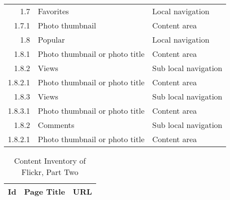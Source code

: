 \documentclass[12pt,a4paper]{article}
\begin{document}
\begin{table}[h!b!p!]
\begin{center}
\begin{small}
\begin{tabular}{|r|l|l|}
              1.7 &
              Favorites &
              Local navigation \\

                1.7.1 &
                Photo thumbnail &
                Content area \\

              1.8 &
              Popular &
              Local navigation \\

                1.8.1 &
                Photo thumbnail or photo title &
                Content area \\

                1.8.2 &
                Views &
                Sub local navigation \\

                  1.8.2.1 &
                  Photo thumbnail or photo title &
                  Content area \\

                1.8.3 &
                Views &
                Sub local navigation \\

                  1.8.3.1 &
                  Photo thumbnail or photo title &
                  Content area \\

                1.8.2 &
                Comments &
                Sub local navigation \\

                  1.8.2.1 &
                  Photo thumbnail or photo title &
                  Content area \\
        \hline

      \end{tabular}
    \end{small}
  \end{center}
\end{table}


\begin{table}[h!b!p!]
  \caption{Content Inventory of Flickr, Part Two}
  \label{table:flickr.content.inventory.2.1}
  \begin{adjustwidth}{-8em}{-8em}
    \begin{center}
      \begin{small}
        \begin{tabular}{|r|l|l|}
          \hline
          Id &
          Page Title &
          URL \\

          \hline


          \hline

        \end{tabular}
      \end{small}
    \end{center}
  \end{adjustwidth}
\end{table}
\end{document}
